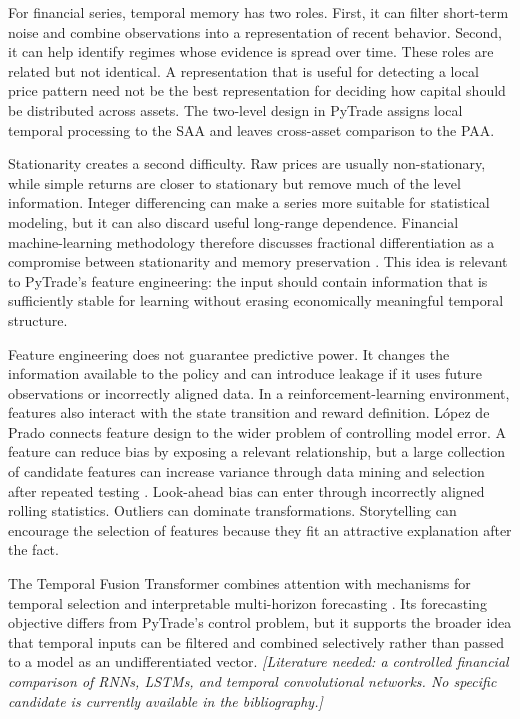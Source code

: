 For financial series, temporal memory has two roles. First, it can filter short-term noise and combine observations into a representation of recent behavior. Second, it can help identify regimes whose evidence is spread over time. These roles are related but not identical. A representation that is useful for detecting a local price pattern need not be the best representation for deciding how capital should be distributed across assets. The two-level design in PyTrade assigns local temporal processing to the SAA and leaves cross-asset comparison to the PAA.

Stationarity creates a second difficulty. Raw prices are usually non-stationary, while simple returns are closer to stationary but remove much of the level information. Integer differencing can make a series more suitable for statistical modeling, but it can also discard useful long-range dependence. Financial machine-learning methodology therefore discusses fractional differentiation as a compromise between stationarity and memory preservation \cite{LopezdePrado.2018}. This idea is relevant to PyTrade's feature engineering: the input should contain information that is sufficiently stable for learning without erasing economically meaningful temporal structure.

Feature engineering does not guarantee predictive power. It changes the information available to the policy and can introduce leakage if it uses future observations or incorrectly aligned data. In a reinforcement-learning environment, features also interact with the state transition and reward definition. López de Prado connects feature design to the wider problem of controlling model error. A feature can reduce bias by exposing a relevant relationship, but a large collection of candidate features can increase variance through data mining and selection after repeated testing \cite{LopezdePrado.2018}. Look-ahead bias can enter through incorrectly aligned rolling statistics. Outliers can dominate transformations. Storytelling can encourage the selection of features because they fit an attractive explanation after the fact.

The Temporal Fusion Transformer combines attention with mechanisms for temporal selection and interpretable multi-horizon forecasting \cite{lim2020tft}. Its forecasting objective differs from PyTrade's control problem, but it supports the broader idea that temporal inputs can be filtered and combined selectively rather than passed to a model as an undifferentiated vector. \textit{[Literature needed: a controlled financial comparison of RNNs, LSTMs, and temporal convolutional networks. No specific candidate is currently available in the bibliography.]}

